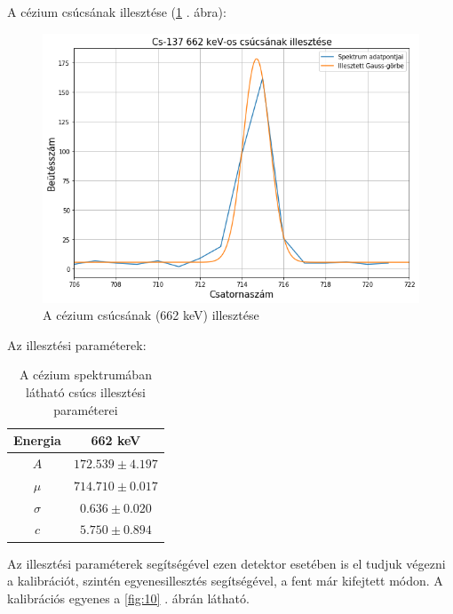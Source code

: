 \documentclass[12pt,a4paper]{article}
\begin{document}
A cézium csúcsának illesztése (\ref{fig:9} . ábra):

\begin{figure}[!h]
\centering
\includegraphics[scale=0.60]{Cs137_1csucs_hpg}
\caption{A cézium csúcsának (662 keV) illesztése}
\label{fig:9}
\end{figure}

Az illesztési paraméterek:
\begin{table}[!h]
\begin{center}
\begin{tabular}{|c|c|}
\hline
Energia & 662 keV \\ 
\hline
$A$ & $172.539 \pm 4.197$\\
\hline
$\mu$ & $714.710 \pm 0.017$\\
\hline
$\sigma$ & $0.636 \pm 0.020$\\
\hline
$c$ & $5.750 \pm 0.894$\\
\hline
\end{tabular}
\caption{A cézium spektrumában látható csúcs illesztési paraméterei}
\end{center}
\end{table}

\newpage

Az illesztési paraméterek segítségével ezen detektor esetében is el tudjuk végezni a kalibrációt, szintén egyenesillesztés segítségével, a fent már kifejtett módon. A kalibrációs egyenes a \ref{fig:10} . ábrán látható.
\end{document}
